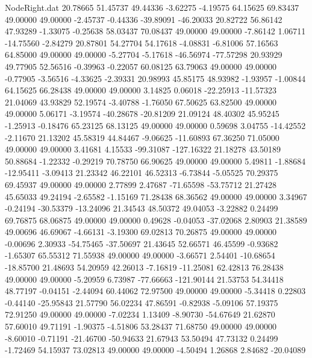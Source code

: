 \begin{filecontents}{NodeRight.dat}
  20.78665   51.45737   49.44336    -3.62275   -4.19575   64.15625   69.83437   49.00000   49.00000   -2.45737   -0.44336  -39.89091  -46.20033
  20.82722   56.86142   47.93289    -1.33075   -0.25638   58.03437   70.08437   49.00000   49.00000   -7.86142    1.06711  -14.75560   -2.84279
  20.87801   54.27704   54.17618    -4.08831   -6.81006   57.16563   64.85000   49.00000   49.00000   -5.27704   -5.17618  -46.56974  -77.57298
  20.93929   49.77905   52.56516    -0.39963   -0.22057   60.08125   63.79063   49.00000   49.00000   -0.77905   -3.56516   -4.33625   -2.39331
  20.98993   45.85175   48.93982    -1.93957   -1.00844   64.15625   66.28438   49.00000   49.00000    3.14825    0.06018  -22.25913  -11.57323
  21.04069   43.93829   52.19574    -3.40788   -1.76050   67.50625   63.82500   49.00000   49.00000    5.06171   -3.19574  -40.28678  -20.81209
  21.09124   48.40302   45.95245    -1.25913   -0.18476   65.23125   68.13125   49.00000   49.00000    0.59698    3.04755  -14.42552   -2.11670
  21.13202   45.58319   44.84467    -9.06625  -11.60893   67.36250   71.05000   49.00000   49.00000    3.41681    4.15533  -99.31087 -127.16322
  21.18278   43.50189   50.88684    -1.22332   -0.29219   70.78750   66.90625   49.00000   49.00000    5.49811   -1.88684  -12.95411   -3.09413
  21.23342   46.22101   46.52313    -6.73844   -5.05525   70.29375   69.45937   49.00000   49.00000    2.77899    2.47687  -71.65598  -53.75712
  21.27428   45.65033   49.24194    -2.65582   -1.15169   71.28438   68.36562   49.00000   49.00000    3.34967   -0.24194  -30.53379  -13.24096
  21.34543   48.50372   49.04053    -3.22882    0.24499   69.76875   68.06875   49.00000   49.00000    0.49628   -0.04053  -37.02068    2.80903
  21.38589   49.00696   46.69067    -4.66131   -3.19300   69.02813   70.26875   49.00000   49.00000   -0.00696    2.30933  -54.75465  -37.50697
  21.43645   52.66571   46.45599    -0.93682   -1.65307   65.55312   71.55938   49.00000   49.00000   -3.66571    2.54401  -10.68654  -18.85700
  21.48693   54.20959   42.26013    -7.16819  -11.25081   62.42813   76.28438   49.00000   49.00000   -5.20959    6.73987  -77.66663 -121.90144
  21.53753   54.34418   48.77197    -0.04151   -2.44094   60.44062   72.97500   49.00000   49.00000   -5.34418    0.22803   -0.44140  -25.95843
  21.57790   56.02234   47.86591    -0.82938   -5.09106   57.19375   72.91250   49.00000   49.00000   -7.02234    1.13409   -8.90730  -54.67649
  21.62870   57.60010   49.71191    -1.90375   -4.51806   53.28437   71.68750   49.00000   49.00000   -8.60010   -0.71191  -21.46700  -50.94633
  21.67943   53.50494   47.73132     0.24499   -1.72469   54.15937   73.02813   49.00000   49.00000   -4.50494    1.26868    2.84682  -20.04089

\end{filecontents}
